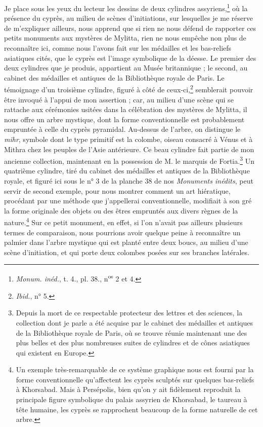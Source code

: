 \documentclass[a4paper, 11pt, oneside, polutonikogreek, french]{article}
\begin{document}
Je place sous les yeux du lecteur les dessins de deux cylindres assyriens,\footnote{\emph{Monum. inéd.}, t. 4., pl. 38., n\textsuperscript{os} 2 et 4.} où la présence du cyprès, au milieu de scènes d'initiations, sur lesquelles je me réserve de m'expliquer ailleurs, nous apprend que si rien ne nous défend de rapporter ces petits monuments aux mystères de Mylitta, rien ne nous empêche non plus de reconnaître ici, comme nous l'avons fait sur les médailles et les bas-reliefs asiatiques cités, que le cyprès est l'image symbolique de la déesse. Le premier des deux cylindres que je produis, appartient au Musée britannique ; le second, au cabinet des médailles et antiques de la Bibliothèque royale de Paris. Le témoignage d'un troisième cylindre, figuré à côté de ceux-ci,\footnote{\emph{Ibid.}, n° 5.} semblerait pouvoir être invoqué à l'appui de mon assertion ; car, au milieu d'une scène qui se rattache aux cérémonies usitées dans la célébration des mystères de Mylitta, il nous offre un arbre mystique, dont la forme conventionnelle est probablement empruntée à celle du cyprès pyramidal. Au-dessus de l'arbre, on distingue le \emph{mihr}, symbole dont le type primitif est la colombe, oiseau consacré à Vénus et à Mithra chez les peuples de l'Asie antérieure. Ce beau cylindre fait partie de mon ancienne collection, maintenant en la possession de M. le marquis de Fortia.\footnote{Depuis la mort de ce respectable protecteur des lettres et des sciences, la collection dont je parle a été acquise par le cabinet des médailles et antiques de la Bibliothèque royale de Paris, où se trouve réunie maintenant une des plus belles et des plus nombreuses suites de cylindres et de cônes asiatiques qui existent en Europe.} Un quatrième cylindre, tiré du cabinet des médailles et antiques de la Bibliothèque royale, et figuré ici sous le n° 3 de la planche 38 de nos \emph{Monuments inédits}, peut servir de second exemple, pour nous montrer comment un art hiératique, procédant par une méthode que j'appellerai conventionnelle, modifiait à son gré la forme originale des objets ou des êtres empruntés aux divers règnes de la nature.\footnote{Un exemple très-remarquable de ce système graphique nous est fourni par la forme conventionnelle qu'affectent les cyprès sculptés sur quelques bas-reliefs à Khorsabad. Mais à Persépolis, bien qu'on y ait fidèlement reproduit la principale figure symbolique du palais assyrien de Khorsabad, le taureau à tête humaine, les cyprès se rapprochent beaucoup de la forme naturelle de cet arbre.} Sur ce petit monument, en effet, si l'on n'avait pas ailleurs plusieurs termes de comparaison, nous pourrions avoir quelque peine à reconnaître un palmier dans l'arbre mystique qui est planté entre deux boucs, au milieu d'une scène d'initiation, et qui porte deux colombes posées sur ses branches latérales.
\end{document}
